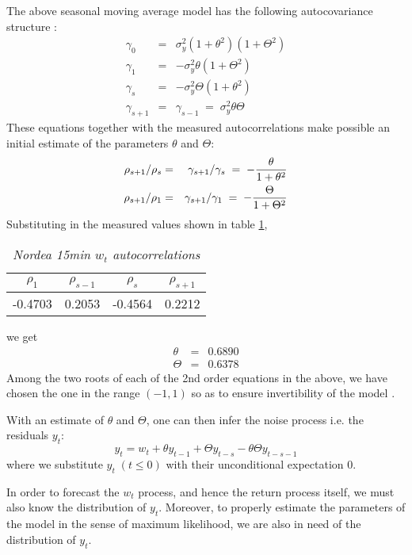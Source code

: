 The above seasonal moving average model has the following
autocovariance structure \cite{BoxJenkins94}:
\begin{eqnarray*}
  \gamma_0 &=& \sigma_y^2 (1 + \theta^2)(1 + \Theta^2) \\
  \gamma_1 &=& -\sigma_y^2\theta(1 + \Theta^2) \\
  \gamma_s &=& -\sigma_y^2\Theta(1 + \theta^2) \\
  \gamma_{s+1} &=& \gamma_{s-1}\;=\;\sigma_y^2\theta\Theta
\end{eqnarray*}
These equations together with the measured autocorrelations make
possible an initial estimate of the parameters $\theta$ and $\Theta$:
\begin{eqnarray*}
  {\rho_{s+1}/\rho_s} &=& {\gamma_{s+1}/\gamma_s} \;=\; -{\theta \over
    1 + \theta^2} \\
  {\rho_{s+1}/\rho_1} &=& {\gamma_{s+1}/\gamma_1} \;=\; -{\Theta \over
    1 + \Theta^2} \\
\end{eqnarray*}
Substituting in the measured values shown in table
\ref{tab:nordea_15min_w_acf},
\begin{table}[htb!]
  \centering
  \begin{tabular}{|c|c|c|c|}
    \hline
    $\rho_1$ & $\rho_{s-1}$ & $\rho_s$ & $\rho_{s+1}$ \\
    \hline
    -0.4703 &  0.2053 & -0.4564 &  0.2212 \\
    \hline
  \end{tabular}
  \caption{\small \it Nordea 15min $w_t$ autocorrelations}
  \label{tab:nordea_15min_w_acf}
\end{table}
we get
\begin{eqnarray*}
  \theta &=& 0.6890 \\
  \Theta &=& 0.6378
\end{eqnarray*}
Among the two roots of each of the 2nd order equations in the above,
we have chosen the one in the range $(-1, 1)$ so as to ensure
invertibility of the model \cite{BoxJenkins94}.

With an estimate of $\theta$ and $\Theta$, one can then infer the
noise process i.e. the residuals $y_t$:
\begin{equation}
  \label{eq:infer_y}
  y_t = w_t + \theta y_{t-1} + \Theta y_{t-s} - \theta \Theta y_{t-s-1}
\end{equation}
where we substitute $y_t\;(t \leq 0)$ with their unconditional
expectation 0.

In order to forecast the $w_t$ process, and hence the return process
itself, we must also know the distribution of $y_t$. Moreover, to
properly estimate the parameters of the model in the sense of maximum
likelihood, we are also in need of the distribution of $y_t$.

